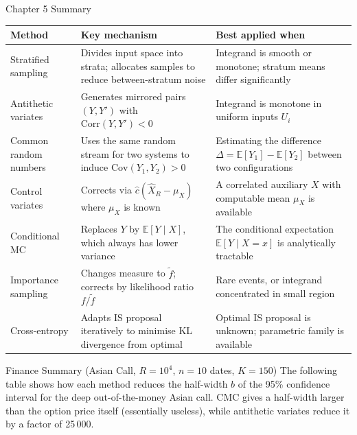\documentclass[aspectratio=169,10pt]{beamer}
\begin{document}
\begin{frame}[allowframebreaks]{Chapter 5 Summary}
\framebreak

\begin{center}
\small
\begin{tabular}{p{2.4cm}p{3.4cm}p{4.3cm}}
  \toprule
  \textbf{Method} & \textbf{Key mechanism} & \textbf{Best applied when} \\
  \midrule
  Stratified sampling &
    Divides input space into strata; allocates samples to reduce between-stratum noise &
    Integrand is smooth or monotone; stratum means differ significantly \\
  \addlinespace
  Antithetic variates &
    Generates mirrored pairs $(Y, Y')$ with $\mathrm{Corr}(Y,Y') < 0$ &
    Integrand is monotone in uniform inputs $U_i$ \\
  \addlinespace
  Common random numbers &
    Uses the same random stream for two systems to induce $\mathrm{Cov}(Y_1,Y_2) > 0$ &
    Estimating the difference $\Delta = \mathbb{E}[Y_1]-\mathbb{E}[Y_2]$ between two configurations \\
  \addlinespace
  Control variates &
    Corrects via $\hat{c}(\hat{X}_R - \mu_X)$ where $\mu_X$ is known &
    A correlated auxiliary $X$ with computable mean $\mu_X$ is available \\
  \addlinespace
  Conditional MC &
    Replaces $Y$ by $\mathbb{E}[Y\mid X]$, which always has lower variance &
    The conditional expectation $\mathbb{E}[Y\mid X=x]$ is analytically tractable \\
  \addlinespace
  Importance sampling &
    Changes measure to $\tilde{f}$; corrects by likelihood ratio $f/\tilde{f}$ &
    Rare events, or integrand concentrated in small region \\
  \addlinespace
  Cross-entropy &
    Adapts IS proposal iteratively to minimise KL divergence from optimal &
    Optimal IS proposal is unknown; parametric family is available \\
  \bottomrule
\end{tabular}
\end{center}

\framebreak

\begin{block}{Finance Summary (Asian Call, $R = 10^4$, $n = 10$ dates, $K = 150$)}
  The following table shows how each method reduces the half-width $b$ of the
  95\% confidence interval for the deep out-of-the-money Asian call.
  CMC gives a half-width larger than the option price itself (essentially useless),
  while antithetic variates reduce it by a factor of 25\,000.


\end{block}
\end{frame}
\end{document}
